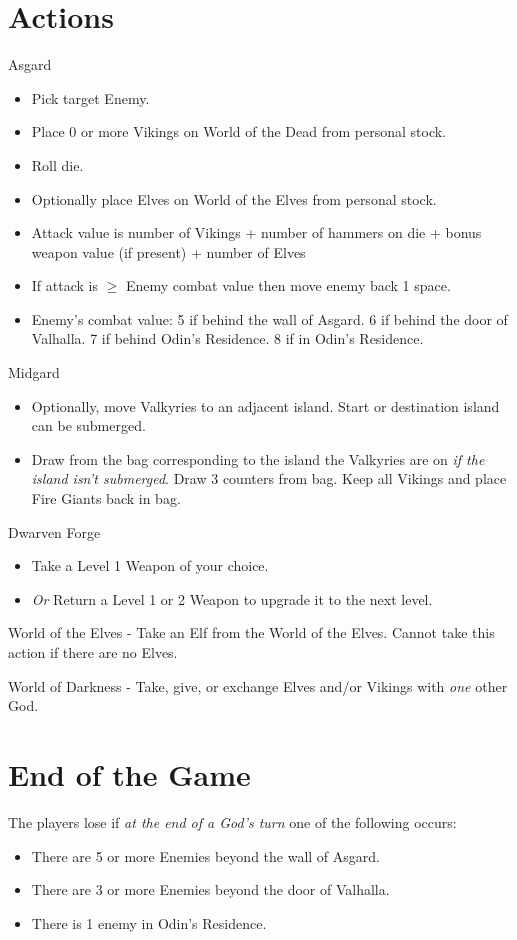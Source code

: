 \documentclass[12pt]{article}
\newenvironment{itemizeCustom}
{\begin{itemize}
  \setlength{\itemsep}{1pt}
  \setlength{\parskip}{0pt}
  \setlength{\parsep}{0pt}}
{\end{itemize}}
\begin{document}
\begin{mdframed}[style = customFrame]
\begin{multicols*}{2}
\section*{Actions}
Asgard
\begin{itemizeCustom}
	\item Pick target Enemy.
	\item Place 0 or more Vikings on World of the Dead from personal stock.
	\item Roll die.
	\item Optionally place Elves on World of the Elves from personal stock.
	\item Attack value is number of Vikings + number of hammers on die + bonus weapon value (if present) + number of Elves
	\item If attack is $\ge$ Enemy combat value then move enemy back 1 space.
	\item Enemy's combat value: 5 if behind the wall of Asgard. 6 if behind the door of Valhalla. 7 if behind Odin's Residence. 8 if in Odin's Residence.
\end{itemizeCustom}

\noindent
Midgard
\begin{itemizeCustom}
	\item Optionally, move Valkyries to an adjacent island. Start or destination island can be submerged.
	\item Draw from the bag corresponding to the island the Valkyries are on \emph{if the island isn't submerged}. Draw 3 counters from bag. Keep all Vikings and place Fire Giants back in bag.
\end{itemizeCustom}

\noindent
Dwarven Forge
\begin{itemizeCustom}
	\item Take a Level 1 Weapon of your choice.
	\item \emph{Or} Return a Level 1 or 2 Weapon to upgrade it to the next level.
\end{itemizeCustom}

\noindent
World of the Elves - Take an Elf from the World of the Elves. Cannot take this action if there are no Elves.

\noindent
World of Darkness - Take, give, or exchange Elves and/or Vikings with \emph{one} other God.

\section*{End of the Game}
The players lose if \emph{at the end of a God's turn} one of the following occurs:
\begin{itemizeCustom}
	\item There are 5 or more Enemies beyond the wall of Asgard.
	\item There are 3 or more Enemies beyond the door of Valhalla.
	\item There is 1 enemy in Odin's Residence.
\end{itemizeCustom}


\end{multicols*}
\end{mdframed}
\end{document}
